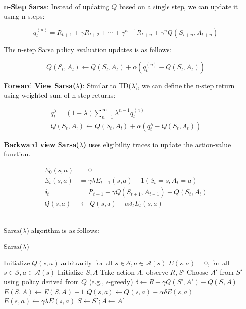\noindent \textbf{n-Step Sarsa}: Instead of updating $Q$ based on a single step, we can update it using n steps:

\[
    q_t^{(n)} = R_{t+1} + \gamma R_{t+2} + \cdots + \gamma^{n-1} R_{t+n} + \gamma^n Q(S_{t+n}, A_{t+n})
\]

\noindent The n-step Sarsa policy evaluation updates is as follows:

\[
    Q(S_t, A_t) \leftarrow Q(S_t, A_t) + \alpha \left( q_t^{(n)} - Q(S_t, A_t) \right)
\]

\noindent \textbf{Forward View Sarsa($\lambda$)}: Similar to TD($\lambda$), we can define the
n-step return using weighted sum of n-step returns:

\begin{gather*}
    q_t^{\lambda} = (1 - \lambda) \sum_{n=1}^{\infty} \lambda^{n-1} q_t^{(n)} \\
    Q(S_t, A_t) \leftarrow Q(S_t, A_t) + \alpha \left( q_t^{\lambda} - Q(S_t, A_t) \right)
\end{gather*}

\noindent \textbf{Backward view Sarsa($\lambda$)} uses eligibility traces to update the
action-value function:

\begin{align*}
    E_0(s, a) & = 0                                                  \\
    E_t(s, a) & = \gamma \lambda E_{t-1}(s, a) + 1(S_t = s, A_t = a) \\
    \delta_t  & = R_{t+1} + \gamma Q(S_{t+1}, A_{t+1}) - Q(S_t, A_t) \\
    Q(s, a)   & \leftarrow Q(s, a) + \alpha \delta_t E_t(s, a)
\end{align*}\

\noindent Sarsa($\lambda$) algorithm is as follows:

\begin{algorithm}[H]
    \caption{Sarsa($\lambda$)}
    \begin{algorithmic}
        \State Initialize $Q(s, a)$ arbitrarily, for all $s \in \mathcal{S}, a \in \mathcal{A}(s)$
        \State $E(s, a) = 0$, for all $s \in \mathcal{S}, a \in \mathcal{A}(s)$
        \State Initialize $S, A$
        \State Take action $A$, observe $R, S'$
        \State Choose $A'$ from $S'$ using policy derived from $Q$ (e.g., $\epsilon$-greedy)
        \State $\delta \leftarrow R + \gamma Q(S', A') - Q(S, A)$
        \State $E(S, A) \leftarrow E(S, A) + 1$
        \State $Q(s, a) \leftarrow Q(s, a) + \alpha \delta E(s, a)$
        \State $E(s, a) \leftarrow \gamma \lambda E(s, a)$
        \EndFor
        \State $S \leftarrow S'; A \leftarrow A'$
    \end{algorithmic}
\end{algorithm}

